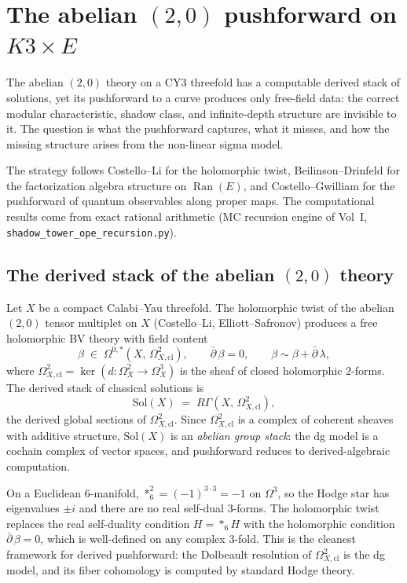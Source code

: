 \documentclass[11pt]{article}
\newcommand{\Ran}{\operatorname{Ran}}
\begin{document}
\section{The abelian $(2,0)$ pushforward on $K3 \times E$}
\label{sec:abelian-20-pushforward}

The abelian $(2,0)$ theory on a CY3 threefold has a computable derived stack of solutions, yet its pushforward to a curve produces only free-field data: the correct modular characteristic, shadow class, and infinite-depth structure are invisible to it. The question is what the pushforward captures, what it misses, and how the missing structure arises from the non-linear sigma model.

The strategy follows Costello--Li for the holomorphic twist, Beilinson--Drinfeld for the factorization algebra structure on $\Ran(E)$, and Costello--Gwilliam for the pushforward of quantum observables along proper maps. The computational results come from exact rational arithmetic (MC recursion engine of Vol~I, \texttt{shadow\_tower\_ope\_recursion.py}).

\subsection{The derived stack of the abelian $(2,0)$ theory}
\label{subsec:20-derived-stack}

Let $X$ be a compact Calabi--Yau threefold. The holomorphic twist of the abelian $(2,0)$ tensor multiplet on $X$ (Costello--Li, Elliott--Safronov) produces a free holomorphic BV theory with field content
\[
 \beta \;\in\; \Omega^{0,*}(X,\, \Omega^2_{X,\mathrm{cl}}),
 \qquad \bar\partial\,\beta = 0,
 \qquad \beta \sim \beta + \bar\partial\,\lambda,
\]
where $\Omega^2_{X,\mathrm{cl}} = \ker(d \colon \Omega^2_X \to \Omega^3_X)$ is the sheaf of closed holomorphic $2$-forms. The derived stack of classical solutions is
\[
 \mathrm{Sol}(X) \;=\; R\Gamma(X,\, \Omega^2_{X,\mathrm{cl}}),
\]
the derived global sections of $\Omega^2_{X,\mathrm{cl}}$. Since $\Omega^2_{X,\mathrm{cl}}$ is a complex of coherent sheaves with additive structure, $\mathrm{Sol}(X)$ is an \emph{abelian group stack}: the dg model is a cochain complex of vector spaces, and pushforward reduces to derived-algebraic computation.

\begin{remark}
\label{rem:self-duality-signature}
On a Euclidean $6$-manifold, $\ast_6^2 = (-1)^{3 \cdot 3} = -1$ on $\Omega^3$, so the Hodge star has eigenvalues $\pm i$ and there are no real self-dual $3$-forms. The holomorphic twist replaces the real self-duality condition $H = \ast_6 H$ with the holomorphic condition $\bar\partial\,\beta = 0$, which is well-defined on any complex $3$-fold. This is the cleanest framework for derived pushforward: the Dolbeault resolution of $\Omega^2_{X,\mathrm{cl}}$ is the dg model, and its fiber cohomology is computed by standard Hodge theory.
\end{remark}
\end{document}
